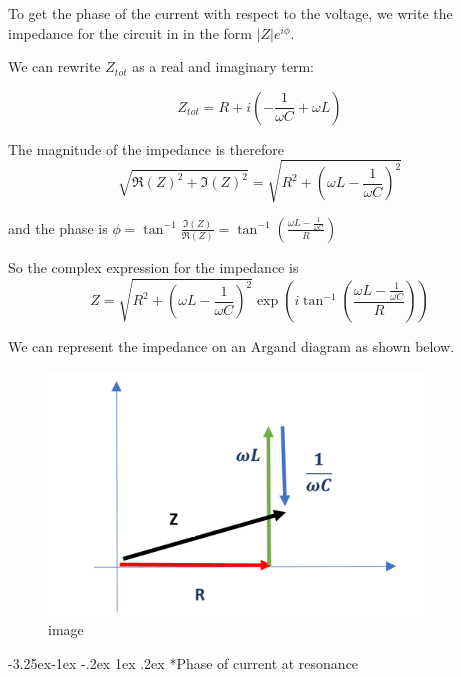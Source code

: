\documentclass[
]{book}
\makeatletter
\renewcommand\subsection{%
\@startsection{subsection}{2}{\z@}%
              {-3.25ex\@plus -1ex \@minus -.2ex}%
              {1ex \@plus .2ex}%
              {\sffamily\bfseries}}
\numberwithin{equation}{section}
\makeatother
\begin{document}
To get the phase of the current with respect to the voltage, we write
the impedance for the circuit in in the form \(|Z| e^{i\phi}\).

We can rewrite \(Z_{tot}\) as a real and imaginary term:

\begin{equation}
\label{eq:ZReal-Im}
Z_{tot} = R + i\left( - \frac{1}{\omega C} + \omega L \right) 
\end{equation}

The magnitude of the impedance is therefore
\begin{equation}
\label{eq:Zmag}
\sqrt{ \Re(Z)^2 + \Im(Z)^2 } = \sqrt{ R^2 + \left( \omega L - \frac{1}{\omega C} \right)^2 }
\end{equation}

and the phase is
\(\phi = \tan^{-1}⁡ \frac{\Im(Z)}{ \Re(Z)}= \tan^{-1}⁡\left( \frac{ \omega L - \frac{1}{\omega C} }{R} \right)\)

So the complex expression for the impedance is
\begin{equation}
\label{eq:complexImpedance}
Z = \sqrt{ R^2 + \left(\omega L - \frac{1}{\omega C} \right)^2 } \exp⁡ \left( i \tan^{-1}⁡ \left( \frac{\omega L - \frac{1}{\omega C} }{R} \right)\right)
\end{equation}

We can represent the impedance on an Argand diagram as shown below.

\begin{figure}
\centering
\includegraphics[width=100mm,height=\textheight]{Figures/Z_argand.png}
\caption{image}
\end{figure}

\hypertarget{phase-of-current-at-resonance}{%
\subsection*{Phase of current at resonance}\label{phase-of-current-at-resonance}}
\end{document}
